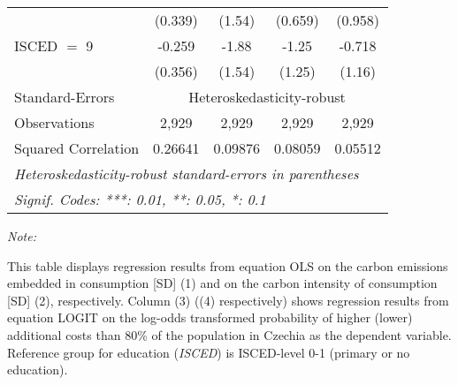 \begin{table}[htbp!]
\begin{adjustbox}{width = 1\textwidth, max height = 0.95\textheight, center}
\begin{threeparttable}[b]
\begin{tabular}{lcccc}
                                 & (0.339)            & (1.54)             & (0.659)        & (0.958)\\   
            ISCED $=$ 9          & -0.259             & -1.88              & -1.25          & -0.718\\   
                                 & (0.356)            & (1.54)             & (1.25)         & (1.16)\\   
            \midrule 
            Standard-Errors & \multicolumn{4}{c}{Heteroskedasticity-robust} \\ 
            Observations         & 2,929              & 2,929              & 2,929          & 2,929\\  
            Squared Correlation  & 0.26641            & 0.09876            & 0.08059        & 0.05512\\  
            \midrule \midrule
            \multicolumn{5}{l}{\emph{Heteroskedasticity-robust standard-errors in parentheses}}\\
            \multicolumn{5}{l}{\emph{Signif. Codes: ***: 0.01, **: 0.05, *: 0.1}}\\
         \end{tabular}
         
         \begin{tablenotes}\item \medskip \textit{Note:}
            \item This table displays regression results from equation OLS on the carbon emissions embedded in consumption [SD] (1) and on the carbon intensity of consumption [SD] (2), respectively. 
                                      Column (3) ((4) respectively) shows regression results from equation LOGIT on the log-odds transformed probability of higher (lower) additional costs than 80\% of the population in Czechia as the dependent variable. Reference group for education (\textit{ISCED}) is ISCED-level 0-1 (primary or no education).
         \end{tablenotes}
      \end{threeparttable}
   \end{adjustbox}
\end{table}


